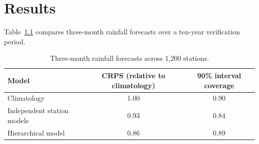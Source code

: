 \chapter{Results}
\label{ch:results}

Table~\ref{tab:crps} compares three-month rainfall forecasts over a ten-year verification
period.

\begin{table}[htbp]
  \centering
  \caption{Three-month rainfall forecasts across 1,200 stations.}
  \label{tab:crps}
  \begin{tabular}{lcc}
    \toprule
    Model & CRPS (relative to climatology) & 90\% interval coverage \\
    \midrule
    Climatology                    & 1.00 & 0.90 \\
    Independent station models     & 0.93 & 0.84 \\
    Hierarchical model             & 0.86 & 0.89 \\
    \bottomrule
  \end{tabular}
\end{table}
